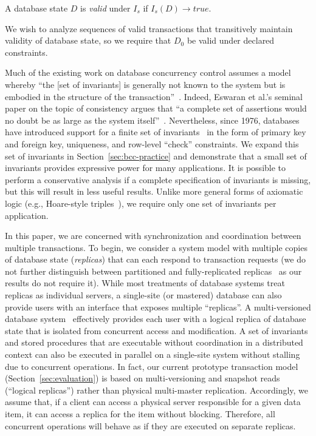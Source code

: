 \begin{definition}
A database state $D$ is \textit{valid} under $I_s$ if $I_s(D) \rightarrow true$.
\end{definition}

We wish to analyze sequences of valid transactions that transitively
maintain validity of database state, so we require that $D_0$ be valid
under declared constraints.

 Much of the existing work on
database concurrency control assumes a model whereby ``the [set of
  invariants] is generally not known to the system but is embodied in
the structure of the transaction''~\cite{traiger-tods}. Indeed,
Eswaran et al.'s seminal paper on the topic of consistency argues that
``a complete set of assertions would no doubt be as large as the
system itself''~\cite{eswaran-consistency}. Nevertheless, since 1976,
databases have introduced support for a finite set of
invariants~\cite{korth-serializability} in the form of primary key and
foreign key, uniqueness, and row-level ``check'' constraints. We
expand this set of invariants in Section~\ref{sec:bcc-practice} and
demonstrate that a small set of invariants provides expressive power
for many applications. It is possible to perform a conservative
analysis if a complete specification of invariants is missing, but
this will result in less useful results. Unlike more general forms of
axiomatic logic (e.g., Hoare-style triples~\cite{decomp-semantics}),
we require only one set of invariants per application.\vspace{.5em}

 In this paper, we are concerned with
synchronization and coordination between multiple transactions. To
begin, we consider a system model with multiple copies of database
state (\textit{replicas}) that can each respond to transaction
requests (we do not further distinguish between partitioned and
fully-replicated replicas~\cite{hat-vldb} as our results do not
require it). While most treatments of database systems treat replicas
as individual servers, a single-site (or mastered) database can also
provide users with an interface that exposes multiple ``replicas''. A
multi-versioned database system~\cite{bernstein-book} effectively
provides each user with a logical replica of database state that is
isolated from concurrent access and modification. A set of invariants
and stored procedures that are executable without coordination in a
distributed context can also be executed in parallel on a single-site
system without stalling due to concurrent operations.  In fact, our
current prototype transaction model (Section~\ref{sec:evaluation}) is
based on multi-versioning and snapshot reads (``logical replicas'')
rather than physical multi-master replication. Accordingly, we assume
that, if a client can access a physical server responsible for a given
data item, it can access a replica for the item without
blocking. Therefore, all concurrent operations will behave as if they
are executed on separate replicas.

